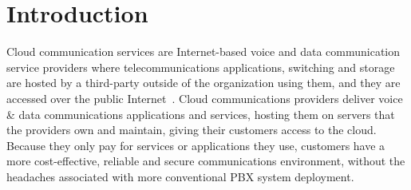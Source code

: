 \section{Introduction}
\label{sec-intro}

Cloud communication services are Internet-based voice and data communication service providers where telecommunications applications, switching and storage are hosted by a third-party outside of the organization using them, and they are accessed over the public Internet~\cite{wikicc}. 
Cloud communications providers deliver voice & data communications applications and services, hosting them on servers that the providers own and maintain, giving their customers access to the cloud. Because they only pay for services or applications they use, customers have a more cost-effective, reliable and secure communications environment, without the headaches associated with more conventional PBX system deployment.
